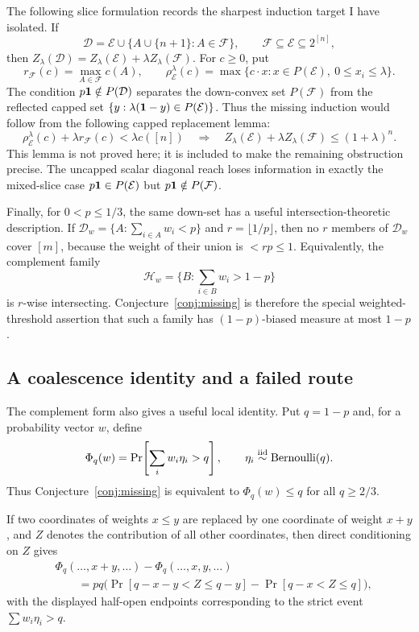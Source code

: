 \documentclass[12pt]{article}
\newcommand{\Ber}{\operatorname{Bernoulli}}
\begin{document}
The following slice formulation records the sharpest induction target I have
isolated.  If
\[
 \mathcal D=\mathcal E\cup\{A\cup\{n+1\}:A\in\mathcal F\},\qquad
 \mathcal F\subseteq\mathcal E\subseteq2^{[n]},
\]
then \(Z_\lambda(\mathcal D)=Z_\lambda(\mathcal E)+\lambda Z_\lambda(\mathcal F)\).
For \(c\ge0\), put
\[
 r_{\mathcal F}(c)=\max_{A\in\mathcal F}c(A),\qquad
 \rho^\lambda_{\mathcal E}(c)=
 \max\{c\cdot x:x\in P(\mathcal E),\ 0\le x_i\le\lambda\}.
\]
The condition \(p{\bf1}\notin P(\mathcal D)\) separates the down-convex set
\(P(\mathcal F)\) from the reflected capped set
\(\{y:\lambda({\bf1}-y)\in P(\mathcal E)\}\).  Thus the missing induction would
follow from the following capped replacement lemma:
\[
 \rho^\lambda_{\mathcal E}(c)+\lambda r_{\mathcal F}(c)<\lambda c([n])
 \quad\Longrightarrow\quad
 Z_\lambda(\mathcal E)+\lambda Z_\lambda(\mathcal F)\le(1+\lambda)^n .
\]
This lemma is not proved here; it is included to make the remaining obstruction
precise.  The uncapped scalar diagonal reach loses information in exactly the
mixed-slice case \(p{\bf1}\in P(\mathcal E)\) but \(p{\bf1}\notin P(\mathcal F)\).

Finally, for \(0<p\le1/3\), the same down-set has a useful
intersection-theoretic description.  If
\(\mathcal D_w=\{A:\sum_{i\in A}w_i<p\}\) and
\(r=\lfloor1/p\rfloor\), then no \(r\) members of \(\mathcal D_w\) cover
\([m]\), because the weight of their union is \(<rp\le1\).  Equivalently, the
complement family
\[
   \mathcal H_w=\{B:\sum_{i\in B}w_i>1-p\}
\]
is \(r\)-wise intersecting.  Conjecture~\ref{conj:missing} is therefore the special
weighted-threshold assertion that such a family has \((1-p)\)-biased measure at
most \(1-p\).

\subsection*{A coalescence identity and a failed route}

The complement form also gives a useful local identity.  Put \(q=1-p\) and,
for a probability vector \(w\), define
\[
      \Phi_q(w)=\Pr\!\left[\sum_i w_i\eta_i>q\right],
      \qquad \eta_i\stackrel{\rm iid}{\sim}\Ber(q).
\]
Thus Conjecture~\ref{conj:missing} is equivalent to \(\Phi_q(w)\le q\) for all
\(q\ge2/3\).

If two coordinates of weights \(x\le y\) are replaced by one coordinate of
weight \(x+y\), and \(Z\) denotes the contribution of all other coordinates,
then direct conditioning on \(Z\) gives
\begin{equation}
\begin{aligned}
&\Phi_q(\ldots,x+y,\ldots)-\Phi_q(\ldots,x,y,\ldots)        \\
&\qquad
 =pq\Big(
       \Pr[q-x-y<Z\le q-y]
       -\Pr[q-x<Z\le q]
     \Big),
\end{aligned}                                      \tag{5}
\end{equation}
with the displayed half-open endpoints corresponding to the strict event
\(\sum w_i\eta_i>q\).
\end{document}
